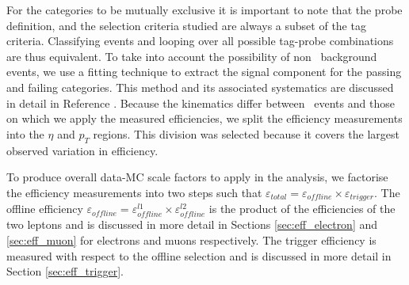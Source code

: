 For the categories to be mutually exclusive it is important to note that the probe definition, 
and the selection criteria studied are always a subset of the tag criteria.
Classifying events and looping over all possible tag-probe combinations are thus equivalent.
To take into account the possibility of non \dyll~background events, we use a fitting technique
to extract the signal component for the passing and failing categories. 
This method and its associated systematics are discussed in detail in Reference \cite{ref:tagprobe_mit_w}.
Because the kinematics differ between \dyll~events and those on which we apply the measured efficiencies,
we split the efficiency measurements into the $\eta$ and $p_T$ regions.
This division was selected because it covers the largest observed variation in efficiency.

To produce overall data-MC scale factors to apply in the analysis, we factorise the efficiency measurements
into two steps such that $\varepsilon_{total} = \varepsilon_{offline} \times \varepsilon_{trigger}$.
The offline efficiency $\varepsilon_{offline} = \varepsilon_{offline}^{l1} \times \varepsilon_{offline}^{l2}$
is the product of the efficiencies of the two leptons and is discussed in more detail in Sections \ref{sec:eff_electron}
and \ref{sec:eff_muon} for electrons and muons respectively.
The trigger efficiency is measured with respect to the offline selection and
 is discussed in more detail in Section \ref{sec:eff_trigger}.

